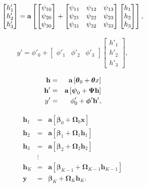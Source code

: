 \documentclass[letterpaper,twoside,openany, titlepage,oldfontcommands,titles,dvipsnames]{memoir}
\begin{document}
\begin{eqnarray}
  \begin{bmatrix}
  h'_{1} \\ h'_{2} \\h'_{3} 
  \end{bmatrix}
  =\mbox{\bf a}\left[\begin{bmatrix}\psi_{10} \\ \psi_{20}\\ \psi_{30}\end{bmatrix} + \begin{bmatrix}\psi_{11} &\psi_{12} & \psi_{13} \\\psi_{21} &\psi_{22} & \psi_{23} \\\psi_{31} &\psi_{32} & \psi_{33} \end{bmatrix} \begin{bmatrix}
  h_{1} \\ h_{2} \\ h_{3}
  \end{bmatrix} \right],
  \end{eqnarray}

\begin{eqnarray}
  y' = \phi'_{0} + \begin{bmatrix} \phi'_{1} & \phi'_{2} & \phi'_{3} \end{bmatrix}\begin{bmatrix}h'_{1} \\ h'_{2} \\h'_{3} \end{bmatrix},
 \end{eqnarray}

\begin{eqnarray}
  \mathbf{h} &=& \mbox{\bf a}\left[\boldsymbol\theta_{0}+\boldsymbol\theta x\right] \nonumber\\
  \mathbf{h}' &=& \mbox{\bf a}\left[\boldsymbol\psi_{0}+\boldsymbol\Psi \mathbf{h}\right] \nonumber \\
  y' &=& \phi'_{0} + \boldsymbol\phi' \mathbf{h}',
 \end{eqnarray}

\begin{eqnarray}\label{eq:dnn_la1}
  \mathbf{h}_{1} &=& \mathbf{a}[\boldsymbol\beta_{0} +\boldsymbol\Omega_{0}\mathbf{x}]\nonumber \\
  \mathbf{h}_{2} &=& \mathbf{a}[\boldsymbol\beta_{1} +\boldsymbol\Omega_{1}\mathbf{h}_{1}]\nonumber \\
  \mathbf{h}_{3} &=& \mathbf{a}[\boldsymbol\beta_{2} +\boldsymbol\Omega_{2}\mathbf{h}_{2}]\nonumber \\
  &\vdots&\nonumber\\
  \mathbf{h}_{K} &=& \mathbf{a}[\boldsymbol\beta_{K-1} +\boldsymbol\Omega_{K-1}\mathbf{h}_{K-1}] \nonumber\\
  \mathbf{y} &=& \boldsymbol\beta_{K} +\boldsymbol\Omega_{K}\mathbf{h}_{K}.
 \end{eqnarray}
\end{document}
